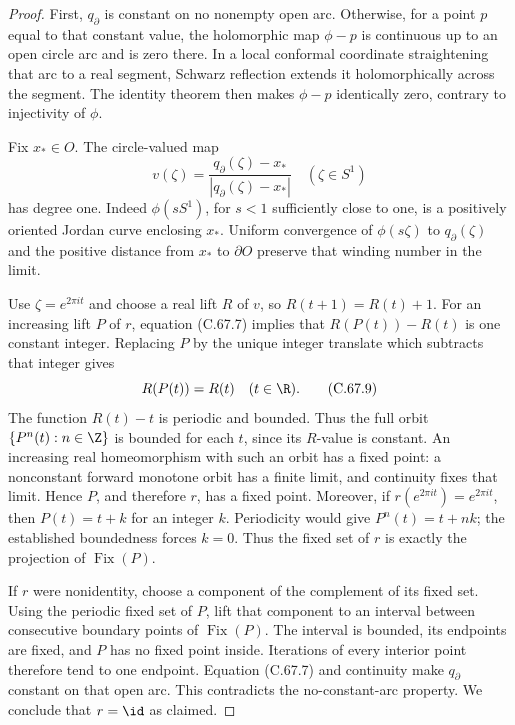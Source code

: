 \begin{proof}
First, $q_\partial$ is constant on no
nonempty open arc. Otherwise, for a point
$p$ equal to that constant value, the
holomorphic map $\phi-p$ is continuous
up to an open circle arc and is zero
there. In a local conformal coordinate
straightening that arc to a real segment,
Schwarz reflection extends it holomorphically
across the segment. The identity theorem
then makes $\phi-p$ identically zero,
contrary to injectivity of $\phi$.

Fix $x_*\in O$. The circle-valued map
\[
 v(\zeta)=\frac{q_\partial(\zeta)-x_*}
                    {|q_\partial(\zeta)-x_*|}
                  \quad(\zeta\in S^1)                 \tag{C.67.8}
\]
has degree one. Indeed $\phi(sS^1)$,
for $s<1$ sufficiently close to one,
is a positively oriented Jordan curve
enclosing $x_*$. Uniform convergence of
$\phi(s\zeta)$ to $q_\partial(\zeta)$
and the positive distance from $x_*$
to $\partial O$ preserve that winding
number in the limit.

Use $\zeta=e^{2\pi i t}$ and choose
a real lift $R$ of $v$, so
$R(t+1)=R(t)+1$. For an increasing
lift $P$ of $r$, equation (C.67.7)
implies that $R(P(t))-R(t)$ is one
constant integer. Replacing $P$ by
the unique integer translate which
subtracts that integer gives
\[
                    R(P(t))=R(t)\quad(t\in\R).
                                                               \tag{C.67.9}
\]
The function $R(t)-t$ is periodic and
bounded. Thus the full orbit
$\{P^n(t):n\in\Z\}$ is bounded for
each $t$, since its $R$-value is
constant. An increasing real
homeomorphism with such an orbit
has a fixed point: a nonconstant
forward monotone orbit has a finite
limit, and continuity fixes that
limit. Hence $P$, and therefore
$r$, has a fixed point.
Moreover, if $r(e^{2\pi i t})=e^{2\pi i t}$,
then $P(t)=t+k$ for an integer $k$.
Periodicity would give $P^n(t)=t+nk$;
the established boundedness forces $k=0$.
Thus the fixed set of $r$ is exactly
the projection of $\operatorname{Fix}(P)$.

If $r$ were nonidentity, choose
a component of the complement
of its fixed set. Using the
periodic fixed set of $P$, lift
that component to an interval
between consecutive boundary
points of $\operatorname{Fix}(P)$.
The interval is bounded, its
endpoints are fixed, and $P$
has no fixed point inside.
Iterations of every interior
point therefore tend to one
endpoint. Equation (C.67.7)
and continuity make $q_\partial$
constant on that open arc.
This contradicts the no-constant-arc
property. We conclude that
$r=\id$ as claimed.


\end{proof}
